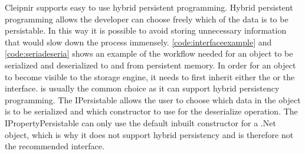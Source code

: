 Cleipnir supports easy to use hybrid persistent programming. Hybrid persistent programming allows the developer can choose freely which of the data is to be persistable. In this way it is possible to avoid storing unnecessary information that would slow down the process immensely. \autoref{code:interfaceexample} and \autoref{code:seriadeseria} shows an example of the workflow needed for an object to be serialized and deserialized to and from persistent memory. In order for an object to become visible to the storage engine, it needs to first inherit either the  or the  interface.  is usually the common choice as it can support hybrid persistency programming. The IPersistable allows the user to choose which data in the object is to be serialized and which constructor to use for the deserialize operation. The IPropertyPersistable can only use the default inbuilt constructor for a .Net object, which is why it does not support hybrid persistency and is therefore not the recommended interface. 
